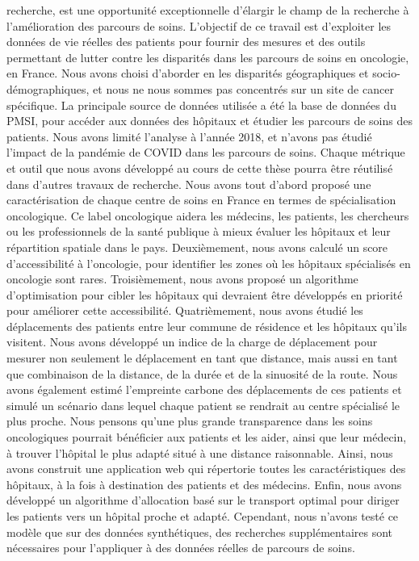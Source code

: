 recherche, est une opportunité exceptionnelle d'élargir le champ de la recherche
à l'amélioration des parcours de soins. L'objectif de ce travail est d'exploiter
les données de vie réelles des patients pour fournir des mesures et des outils
permettant de lutter contre les disparités dans les parcours de soins en
oncologie, en France. Nous avons choisi d'aborder en les disparités
géographiques et socio-démographiques, et nous ne nous sommes pas concentrés sur
un site de cancer spécifique. La principale source de données utilisée a été la
base de données du PMSI, pour accéder aux données des hôpitaux et étudier les
parcours de soins des patients. Nous avons limité l'analyse à l'année 2018, et
n'avons pas étudié l'impact de la pandémie de COVID dans les parcours de soins.
Chaque métrique et outil que nous avons développé au cours de cette thèse pourra
être réutilisé dans d'autres travaux de recherche. Nous avons tout d’abord
proposé une caractérisation de chaque centre de soins en France en termes de
spécialisation oncologique. Ce label oncologique aidera les médecins, les
patients, les chercheurs ou les professionnels de la santé publique à mieux
évaluer les hôpitaux et leur répartition spatiale dans le pays. Deuxièmement,
nous avons calculé un score d'accessibilité à l'oncologie, pour identifier les
zones où les hôpitaux spécialisés en oncologie sont rares. Troisièmement, nous
avons proposé un algorithme d'optimisation pour cibler les hôpitaux qui
devraient être développés en priorité pour améliorer cette accessibilité.
Quatrièmement, nous avons étudié les déplacements des patients entre leur
commune de résidence et les hôpitaux qu'ils visitent. Nous avons développé un
indice de la charge de déplacement pour mesurer non seulement le déplacement en
tant que distance, mais aussi en tant que combinaison de la distance, de la
durée et de la sinuosité de la route. Nous avons également estimé l'empreinte
carbone des déplacements de ces patients et simulé un scénario dans lequel
chaque patient se rendrait au centre spécialisé le plus proche. Nous pensons
qu'une plus grande transparence dans les soins oncologiques pourrait bénéficier
aux patients et les aider, ainsi que leur médecin, à trouver l'hôpital le plus
adapté situé à une distance raisonnable. Ainsi, nous avons construit une
application web qui répertorie toutes les caractéristiques des hôpitaux, à la
fois à destination des patients et des médecins. Enfin, nous avons développé un
algorithme d'allocation basé sur le transport optimal pour diriger les patients
vers un hôpital proche et adapté. Cependant, nous n'avons testé ce modèle que
sur des données synthétiques, des recherches supplémentaires sont nécessaires
pour l'appliquer à des données réelles de parcours de soins.
